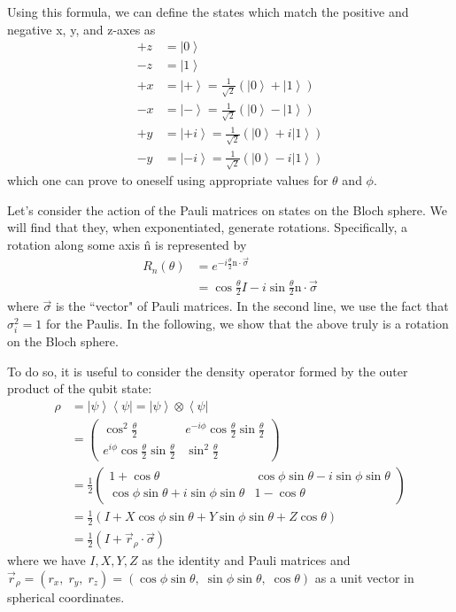 \documentclass[11pt]{article} %
\newcommand{\bra}[1]{\left\langle #1 \right|}
\newcommand{\ket}[1]{\left|#1\right\rangle}
\begin{document}
Using this formula, we can define the states which match the positive and negative x, y, and z-axes as
\begin{align}
    +z &= \ket{0}\nonumber\\
    -z &= \ket{1}\nonumber\\
    +x &= \ket{+} = \frac{1}{\sqrt{2}}\left(\ket{0} + \ket{1}\right)\nonumber\\
    -x &= \ket{-} = \frac{1}{\sqrt{2}}\left(\ket{0} - \ket{1}\right)\nonumber\\
    +y &= \ket{+i} = \frac{1}{\sqrt{2}}\left(\ket{0} + i\ket{1}\right)\nonumber\\
    -y &= \ket{-i} = \frac{1}{\sqrt{2}}\left(\ket{0} - i\ket{1}\right)
\end{align}
which one can prove to oneself using appropriate values for $\theta$ and $\phi$.

Let's consider the action of the Pauli matrices on states on the Bloch sphere. We will find that they, when exponentiated, generate rotations. Specifically, a rotation along some axis \^n is represented by
\begin{align}
    R_n(\theta) &= e^{-i\frac{\theta}{2}\textrm{\^n}\cdot\vec{\sigma}}\\
    &= \cos\frac{\theta}{2} I - i\sin\frac{\theta}{2} \textrm{\^n}\cdot\vec{\sigma}
\end{align}
where $\vec{\sigma}$ is the ``vector" of Pauli matrices. In the second line, we use the fact that $\sigma_i^2 = 1$ for the Paulis. In the following, we show that the above truly is a rotation on the Bloch sphere.

To do so, it is useful to consider the density operator formed by the outer product of the qubit state:
\begin{align}
    \rho &= \ket{\psi}\bra{\psi} = \ket{\psi}\otimes\bra{\psi}\\
    &=
        \begin{pmatrix}
            \cos^2\frac{\theta}{2} & e^{-i\phi}\cos\frac{\theta}{2}\sin\frac{\theta}{2} \\
            e^{i\phi}\cos\frac{\theta}{2}\sin\frac{\theta}{2} & \sin^2\frac{\theta}{2}
        \end{pmatrix}\nonumber\\
    &= \frac{1}{2}
        \begin{pmatrix}
            1+\cos\theta & \cos\phi\sin\theta - i\sin\phi\sin\theta \\
            \cos\phi\sin\theta + i\sin\phi\sin\theta & 1-\cos\theta
        \end{pmatrix}\\
    &= \frac{1}{2}\left(I+X\cos\phi\sin\theta + Y\sin\phi\sin\theta+Z\cos\theta\right)\\
    &= \frac{1}{2}\left(I+\vec{r}_\rho\cdot\vec{\sigma}\right)
\end{align}
where we have $I, X, Y, Z$ as the identity and Pauli matrices and $\vec{r}_\rho = (r_x,\;r_y,\;r_z) = (\cos\phi\sin\theta,\;\sin\phi\sin\theta,\;\cos\theta)$ as a unit vector in spherical coordinates.
\end{document}
